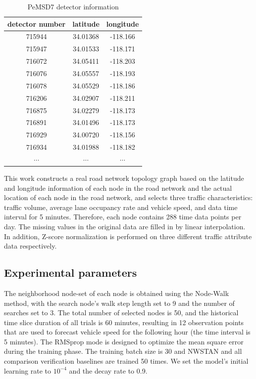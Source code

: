 \documentclass[conference]{IEEEtran}
\begin{document}
\begin{table}[htbp]
    \caption{PeMSD7 detector information}
    \begin{center}
    \begin{tabular}{|c|c|c|}
    \hline
        detector number & latitude &  longitude \\
    \hline    
        715944 & 34.01368 & -118.166 \\
        715947 & 34.01533 & -118.171 \\
        716072 & 34.05411 & -118.203 \\
        716076 & 34.05557 & -118.193 \\
        716078 & 34.05529 & -118.186 \\
        716206 & 34.02907 & -118.211 \\
        716875 & 34.02279 & -118.173 \\
        716891 & 34.01496 & -118.173 \\
        716929 & 34.00720 & -118.156 \\
        716934 & 34.01988 & -118.182 \\
        $\cdots$ & $\cdots$ & $\cdots$ \\
    \hline
    \end{tabular}
    \label{tab1}
    \end{center}
\end{table}
    

\par
This work constructs a real road network topology graph based on the latitude and longitude information of each node in the road network and the actual location of each node in the road network, and selects three traffic characteristics: traffic volume, average lane occupancy rate and vehicle speed, and data time interval for 5 minutes. Therefore, each node contains 288 time data points per day. The missing values in the original data are filled in by linear interpolation. In addition, Z-score normalization is performed on three different traffic attribute data respectively.



\subsection{Experimental parameters}
\par
The neighborhood node-set of each node is obtained using the Node-Walk method, with the search node's walk step length set to 9 and the number of searches set to 3. The total number of selected nodes is 50, and the historical time slice duration of all trials is 60 minutes, resulting in 12 observation points that are used to forecast vehicle speed for the following hour (the time interval is 5 minutes). The RMSprop mode is designed to optimize the mean square error during the training phase. The training batch size is 30 and NWSTAN and all comparison verification baselines are trained 50 times. We set the model's initial learning rate to $10^{-4}$ and the decay rate to 0.9.
\end{document}
